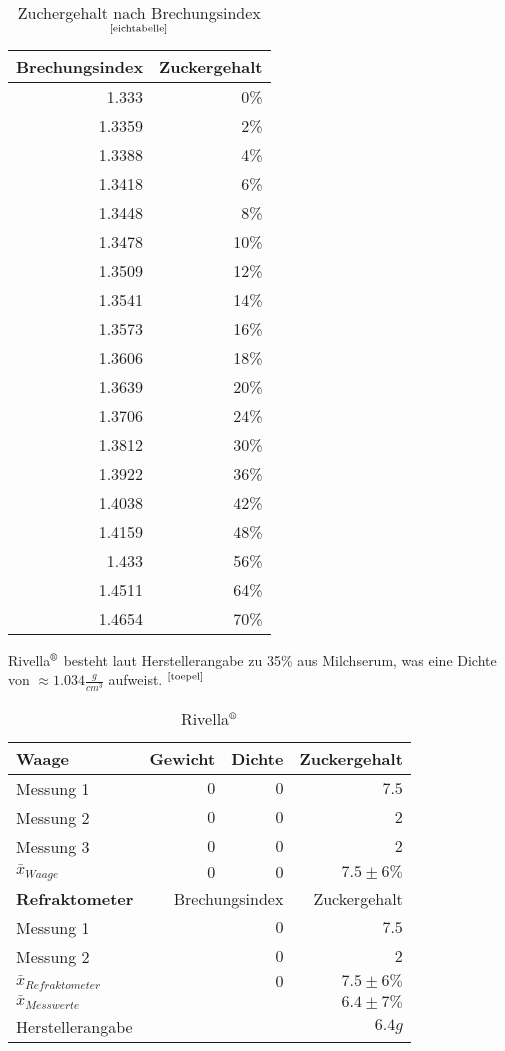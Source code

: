 \documentclass[a4paper]{article}
\newcommand{\superscript}[1]{\ensuremath{^{\textrm{#1}}}}
\begin{document}
\begin{table}[H]
\caption{Zuchergehalt nach Brechungsindex\superscript{\cite{eichtabelle}}}
\centering
\begin{tabular}{rr}
\toprule
\bfseries Brechungsindex & Zuckergehalt \\
\midrule
1.333	&	0\%		\\
1.3359	&	2\%		\\
1.3388	&	4\%		\\
1.3418	&	6\%		\\
1.3448	&	8\%		\\
1.3478	&	10\%	\\
1.3509	&	12\%	\\
1.3541	&	14\%	\\
1.3573	&	16\%	\\
1.3606	&	18\%	\\
1.3639	&	20\%	\\
1.3706	&	24\%	\\
1.3812	&	30\%	\\
1.3922	&	36\%	\\
1.4038	&	42\%	\\
1.4159	&	48\%	\\
1.433	&	56\%	\\
1.4511	&	64\%	\\
1.4654	&	70\%  \\
\bottomrule
\end{tabular}
\end{table}


Rivella\superscript{\textregistered} besteht laut Herstellerangabe zu 35\% aus Milchserum, was eine Dichte von \(\approx 1.034\frac{g}{cm^3}\) aufweist. \superscript{\cite{toepel}}

\begin{table}[H]
\caption{Rivella\superscript{\textregistered}}
\centering
\begin{tabular}{lrrr}
\toprule
\bfseries Waage & Gewicht & Dichte & Zuckergehalt \\
\midrule
Messung 1 & $0$ & $0$ & $7.5$ \\
Messung 2 & $0$ & $0$ & $2$ \\
Messung 3 & $0$ & $0$ & $2$ \\
\midrule
$\bar{x}_{Waage}$ & $0$ & $0$ & $7.5 \pm 6\%$ \\
\toprule
\vspace{-1mm}
\bfseries Refraktometer & \multicolumn{2}{r}{Brechungsindex} & Zuckergehalt \\
\midrule
Messung 1 & & $0$ & $7.5$ \\
Messung 2 & & $0$ & $2$ \\
\midrule
$\bar{x}_{Refraktometer}$ & & $0$ & $7.5 \pm 6\%$ \\
\bottomrule
$\bar{x}_{Messwerte}$ & & & $6.4 \pm 7\%$ \\
\bottomrule
Herstellerangabe & & & $6.4g$ \\
\bottomrule
\end{tabular}
\end{table}
\end{document}
